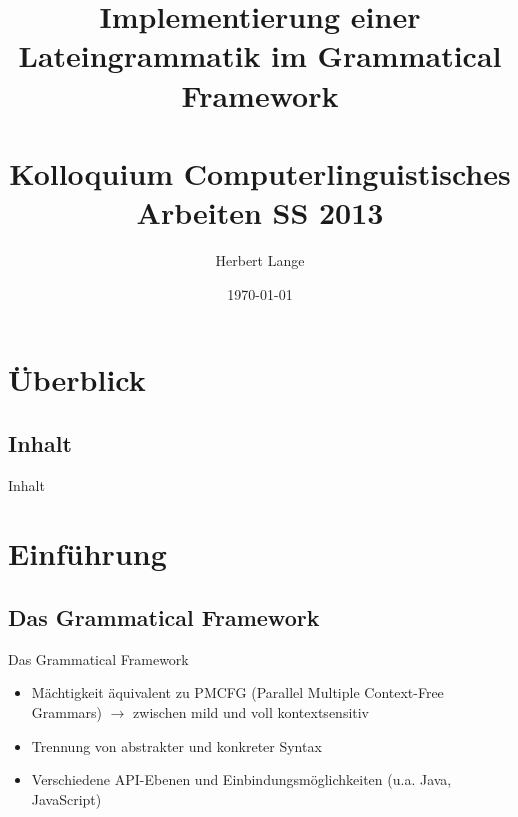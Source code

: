 \documentclass{beamer}
\title{Implementierung einer Lateingrammatik im Grammatical Framework \\ \quad \\ \large Kolloquium Computerlinguistisches Arbeiten SS 2013 }
\author{Herbert Lange}
\date{\today}
\begin{document}
\frame{\titlepage}

\section*{Überblick}
\subsection*{Inhalt}
\begin{frame}{Inhalt}
\tableofcontents
\end{frame}
\section{Einführung}
\subsection{Das Grammatical Framework}
\begin{frame}[fragile]{Das Grammatical Framework}
\begin{itemize}
\item Mächtigkeit äquivalent zu PMCFG (Parallel Multiple Context-Free Grammars)
$\rightarrow$ zwischen mild und voll kontextsensitiv
\item Trennung von abstrakter und konkreter Syntax
\item Verschiedene API-Ebenen und Einbindungsmöglichkeiten (u.a. Java, JavaScript)
\end{itemize}
\end{frame}
\end{document}
